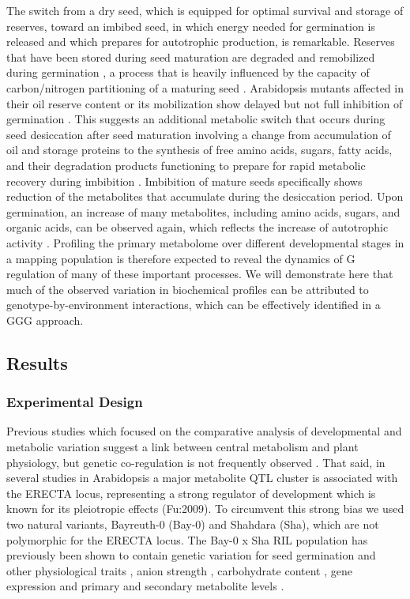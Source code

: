The switch from a dry seed, which is equipped for optimal survival and storage of reserves, toward an
imbibed seed, in which energy needed for germination is released and which prepares for autotrophic 
production, is remarkable. Reserves that have been stored during seed maturation are degraded and remobilized
during germination \cite{Bewley:1997,Shu:2008}, a process that is heavily influenced by the capacity 
of carbon/nitrogen partitioning of a maturing seed \cite{Dowdle:2007}. Arabidopsis mutants affected 
in their oil reserve content or its mobilization show delayed but not full inhibition of germination 
\cite{Kinnersley:2000, Bouche:2004, Shu:2008, Kelly:2011}. This suggests 
an additional metabolic switch that occurs during seed desiccation after seed maturation involving a change 
from accumulation of oil and storage proteins to the synthesis of free amino acids, sugars, fatty acids, 
and their degradation products functioning to prepare for rapid metabolic recovery during imbibition 
\cite{Fait:2006, Angelovici:2010}. Imbibition of mature seeds specifically shows reduction of 
the metabolites that accumulate during the desiccation period. Upon germination, an increase of many 
metabolites, including amino acids, sugars, and organic acids, can be observed again, which reflects 
the increase of autotrophic activity \cite{Fait:2006}. Profiling the primary metabolome over different 
developmental stages in a mapping population is therefore expected to reveal the dynamics of G regulation 
of many of these important processes. We will demonstrate here that much of the observed variation in 
biochemical profiles can be attributed to genotype-by-environment interactions, which can be effectively 
identified in a GGG approach.

\subsection{Results}

\subsubsection{Experimental Design}
Previous studies which focused on the comparative analysis of developmental and metabolic variation suggest 
a link between central metabolism and plant physiology, but genetic co-regulation is not frequently observed 
\cite{Keurentjes:2006, Meyer:2007}.  That said, in several studies in Arabidopsis a major 
metabolite QTL cluster is associated with the ERECTA locus, representing a strong regulator of development 
which is known for its pleiotropic effects (Fu:2009). To circumvent this strong bias we used two 
natural variants, Bayreuth-0 (Bay-0) and Shahdara (Sha), which are not polymorphic for the ERECTA locus. 
The Bay-0 x Sha RIL population \cite{Loudet:2002} has previously been shown to contain genetic variation 
for seed germination \cite{Joosen:2011} and other physiological traits \cite{Loudet:2003a, Barriere:2005, 
Loudet:2005, Diaz:2006, Reymond:2006, Loudet:2008, Meng:2008}, anion strength 
\cite{Loudet:2003a}, carbohydrate content \cite{Calenge:2006}, gene expression \cite{West:2007} and primary 
\cite{Rowe:2008} and secondary metabolite levels \cite{Wentzell:2007}. 

